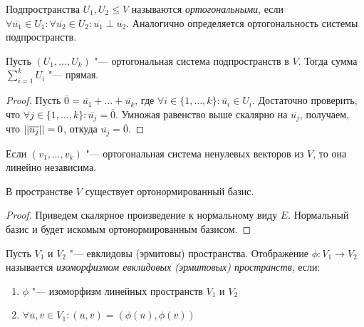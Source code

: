 \begin{definition}
	Подпространства $U_1, U_2 \le V$ называются \textit{ортогональными}, если $\forall \overline{u_1} \in U_1: \forall \overline{u_2} \in U_2: \overline{u_1} \perp \overline{u_2}$. Аналогично определяется ортогональность системы подпространств.
\end{definition}

\begin{proposition}
	Пусть $(U_1, \dots, U_k)$ "--- ортогональная система подпространств в $V$. Тогда сумма $\sum_{i = 1}^kU_i$ "--- прямая.
\end{proposition}

\begin{proof}
	Пусть $\overline{0} = \overline{u_1} + \dots + \overline{u_k}$, где $\forall i \in \{1, \dotsc, k\}: \overline{u_i} \in U_i$. Достаточно проверить, что $\forall j \in \{1, \dots, k\}: \overline{u_j} = \overline{0}$. Умножая равенство выше скалярно на $\overline{u_j}$, получаем, что $||\overline{u_j}|| \hm{=} 0$, откуда $\overline{u_j} = \overline{0}$.
\end{proof}

\begin{corollary}
	Если $(v_1, \dots, v_k)$ "--- ортогональная система ненулевых векторов из $V$, то она линейно независима.
\end{corollary}

\begin{proposition}
	В пространстве $V$ существует ортонормированный базис.
\end{proposition}

\begin{proof}
	Приведем скалярное произведение к нормальному виду $E$. Нормальный базис и будет искомым ортонормированным базисом.
\end{proof}

\begin{definition}
	Пусть $V_1$ и $V_2$ "--- евклидовы (эрмитовы) пространства. Отображение $\phi: V_1 \rightarrow V_2$ называется \textit{изоморфизмом евклидовых (эрмитовых) пространств}, если:
	\begin{enumerate}
		\item $\phi$ "--- изоморфизм линейных пространств $V_1$ и $V_2$
		\item $\forall \overline{u}, \overline{v} \in V_1: (\overline{u}, \overline{v}) = (\phi(\overline{u}), \phi(\overline{v}))$
	\end{enumerate}
\end{definition}

